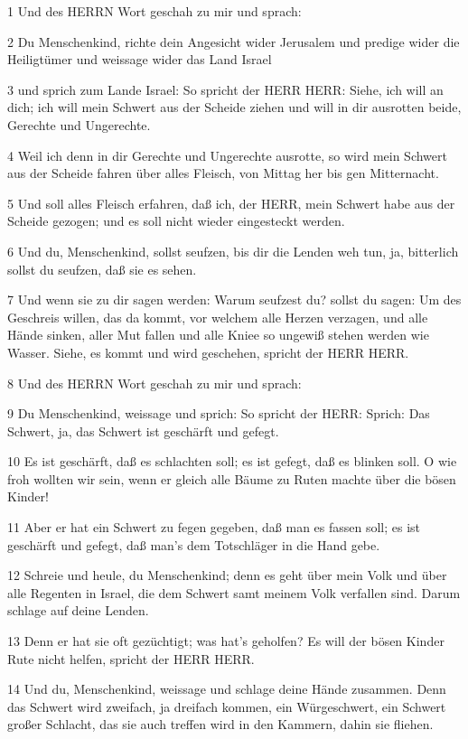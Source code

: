 \par 1 Und des HERRN Wort geschah zu mir und sprach:
\par 2 Du Menschenkind, richte dein Angesicht wider Jerusalem und predige wider die Heiligtümer und weissage wider das Land Israel
\par 3 und sprich zum Lande Israel: So spricht der HERR HERR: Siehe, ich will an dich; ich will mein Schwert aus der Scheide ziehen und will in dir ausrotten beide, Gerechte und Ungerechte.
\par 4 Weil ich denn in dir Gerechte und Ungerechte ausrotte, so wird mein Schwert aus der Scheide fahren über alles Fleisch, von Mittag her bis gen Mitternacht.
\par 5 Und soll alles Fleisch erfahren, daß ich, der HERR, mein Schwert habe aus der Scheide gezogen; und es soll nicht wieder eingesteckt werden.
\par 6 Und du, Menschenkind, sollst seufzen, bis dir die Lenden weh tun, ja, bitterlich sollst du seufzen, daß sie es sehen.
\par 7 Und wenn sie zu dir sagen werden: Warum seufzest du? sollst du sagen: Um des Geschreis willen, das da kommt, vor welchem alle Herzen verzagen, und alle Hände sinken, aller Mut fallen und alle Kniee so ungewiß stehen werden wie Wasser. Siehe, es kommt und wird geschehen, spricht der HERR HERR.
\par 8 Und des HERRN Wort geschah zu mir und sprach:
\par 9 Du Menschenkind, weissage und sprich: So spricht der HERR: Sprich: Das Schwert, ja, das Schwert ist geschärft und gefegt.
\par 10 Es ist geschärft, daß es schlachten soll; es ist gefegt, daß es blinken soll. O wie froh wollten wir sein, wenn er gleich alle Bäume zu Ruten machte über die bösen Kinder!
\par 11 Aber er hat ein Schwert zu fegen gegeben, daß man es fassen soll; es ist geschärft und gefegt, daß man's dem Totschläger in die Hand gebe.
\par 12 Schreie und heule, du Menschenkind; denn es geht über mein Volk und über alle Regenten in Israel, die dem Schwert samt meinem Volk verfallen sind. Darum schlage auf deine Lenden.
\par 13 Denn er hat sie oft gezüchtigt; was hat's geholfen? Es will der bösen Kinder Rute nicht helfen, spricht der HERR HERR.
\par 14 Und du, Menschenkind, weissage und schlage deine Hände zusammen. Denn das Schwert wird zweifach, ja dreifach kommen, ein Würgeschwert, ein Schwert großer Schlacht, das sie auch treffen wird in den Kammern, dahin sie fliehen.
